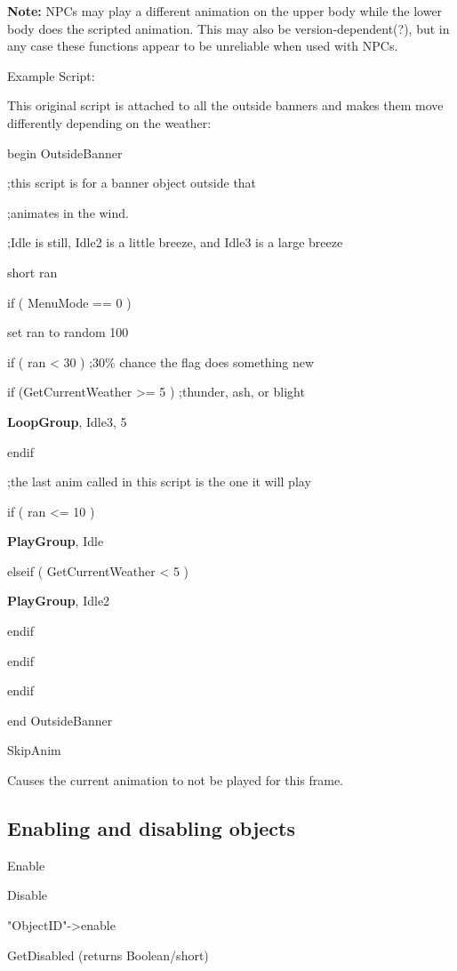 \documentclass[
]{article}
\begin{document}
\textbf{Note:} NPCs may play a different animation on the upper body
while the lower body does the scripted animation. This may also be
version-dependent(?), but in any case these functions appear to be
unreliable when used with NPCs.

Example Script:

This original script is attached to all the outside banners and makes
them move differently depending on the weather:

begin OutsideBanner

;this script is for a banner object outside that

;animates in the wind.

;Idle is still, Idle2 is a little breeze, and Idle3 is a large breeze

short ran

if ( MenuMode == 0 )

set ran to random 100

if ( ran \textless{} 30 ) ;30\% chance the flag does something new

if (GetCurrentWeather \textgreater= 5 ) ;thunder, ash, or blight

\textbf{LoopGroup}, Idle3, 5

endif

;the last anim called in this script is the one it will play

if ( ran \textless= 10 )

\textbf{PlayGroup}, Idle

elseif ( GetCurrentWeather \textless{} 5 )

\textbf{PlayGroup}, Idle2

endif

endif

endif

end OutsideBanner

SkipAnim

Causes the current animation to not be played for this frame.

\hypertarget{enabling-and-disabling-objects}{%
\subsection{Enabling and disabling
objects}\label{enabling-and-disabling-objects}}

Enable

Disable

"ObjectID"-\textgreater enable

GetDisabled (returns Boolean/short)
\end{document}
